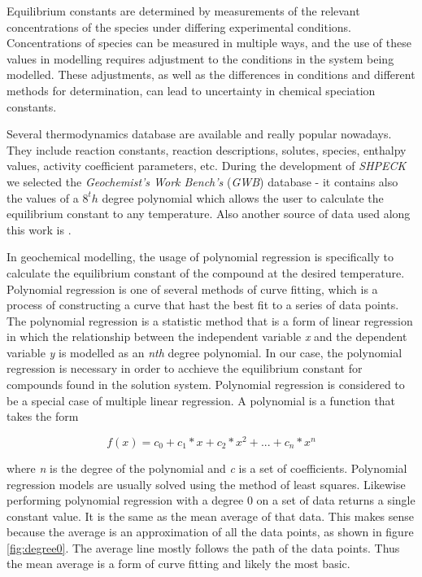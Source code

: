 \documentclass[ppgc,mestrado,english]{iiufrgs}
\begin{document}
Equilibrium constants are determined by measurements of the relevant concentrations of the species under differing experimental conditions. Concentrations of species can be measured in multiple ways, and the use of these values in modelling requires adjustment to the conditions in the system being modelled. These adjustments, as well as the differences in conditions and different methods for determination, can lead to uncertainty in chemical speciation constants.

Several thermodynamics database are available and really popular nowadays. They include reaction constants, reaction descriptions, solutes, species, enthalpy values, activity coefficient parameters, etc. During the development of \emph{SHPECK} we selected the \emph{Geochemist's Work Bench's} (\emph{GWB}) database - it contains also the values of a $8^th$ degree polynomial which allows the user to calculate the equilibrium constant to any temperature. Also another source of data used along this work is \cite{Palandri:04}.

In geochemical modelling, the usage of polynomial regression is specifically to calculate the equilibrium constant of the compound at the desired temperature. 
Polynomial regression is one of several methods of curve fitting, which is a process of constructing a curve that hast the best fit to a series of data points. The polynomial regression is a statistic method that is a form of linear regression in which the relationship between the independent variable \emph{x} and the dependent variable \emph{y} is modelled as an \emph{nth} degree polynomial. In our case, the polynomial regression is necessary in order to acchieve the equilibrium constant for compounds found in the solution system.
Polynomial regression is considered to be a special case of multiple linear regression. A polynomial is a function that takes the form 

\begin{equation} \label{eq:polynomialForm}
f(x) = c_0 + c_1 * x + c_2 * x^2 + ... + c_n * x^n
\end{equation}

where \emph{n} is the degree of the polynomial and \emph{c} is a set of coefficients. Polynomial regression models are usually solved using the method of least squares. Likewise performing polynomial regression with a degree 0 on a set of data returns a single constant value. It is the same as the mean average of that data. This makes sense because the average is an approximation of all the data points, as shown in figure \ref{fig:degree0}. The average line mostly follows the path of the data points. Thus the mean average is a form of curve fitting and likely the most basic.
\end{document}
